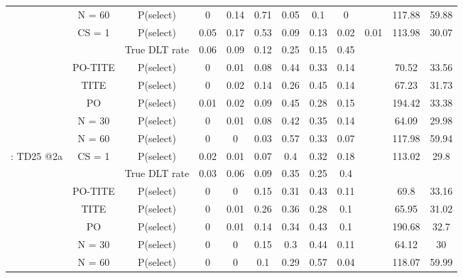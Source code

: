 \begin{table}
\begin{singlespace}
{\begin{tabular}[t]{cccccccccccc}
			\rowcolor{gray!6}   & N = 60 & P(select) & 0 & 0.14 & 0.71 & 0.05 & 0.1 & 0 &  & 117.88 & 59.88\\
			
			\rowcolor{gray!6}  \multirow{-7}{*}{\centering\arraybackslash 11: TD25 @1} & CS = 1 & P(select) & 0.05 & 0.17 & 0.53 & 0.09 & 0.13 & 0.02 & 0.01 & 113.98 & 30.07\\
			\cmidrule{1-12}
			&  & True DLT rate & 0.06 & 0.09 & 0.12 & 0.25 & 0.15 & 0.45 &  &  & \\
			
			& PO-TITE & P(select) & 0 & 0.01 & 0.08 & 0.44 & 0.33 & 0.14 &  & 70.52 & 33.56\\
			
			& TITE & P(select) & 0 & 0.02 & 0.14 & 0.26 & 0.45 & 0.14 &  & 67.23 & 31.73\\
			
			& PO & P(select) & 0.01 & 0.02 & 0.09 & 0.45 & 0.28 & 0.15 &  & 194.42 & 33.38\\
			
			& N = 30 & P(select) & 0 & 0.01 & 0.08 & 0.42 & 0.35 & 0.14 &  & 64.09 & 29.98\\
			
			& N = 60 & P(select) & 0 & 0 & 0.03 & 0.57 & 0.33 & 0.07 &  & 117.98 & 59.94\\
			
			\multirow{-7}{*}{\centering\arraybackslash 12: TD25 @2a} & CS = 1 & P(select) & 0.02 & 0.01 & 0.07 & 0.4 & 0.32 & 0.18 &  & 113.02 & 29.8\\
			\cmidrule{1-12}
			\rowcolor{gray!6}   &  & True DLT rate & 0.03 & 0.06 & 0.09 & 0.35 & 0.25 & 0.4 &  &  & \\
			
			\rowcolor{gray!6}   & PO-TITE & P(select) & 0 & 0 & 0.15 & 0.31 & 0.43 & 0.11 &  & 69.8 & 33.16\\
			
			\rowcolor{gray!6}   & TITE & P(select) & 0 & 0.01 & 0.26 & 0.36 & 0.28 & 0.1 &  & 65.95 & 31.02\\
			
			\rowcolor{gray!6}   & PO & P(select) & 0 & 0.01 & 0.14 & 0.34 & 0.43 & 0.1 &  & 190.68 & 32.7\\
			
			\rowcolor{gray!6}   & N = 30 & P(select) & 0 & 0 & 0.15 & 0.3 & 0.44 & 0.11 &  & 64.12 & 30\\
			
			\rowcolor{gray!6}   & N = 60 & P(select) & 0 & 0 & 0.1 & 0.29 & 0.57 & 0.04 &  & 118.07 & 59.99\\
			

\end{tabular}}
\end{singlespace}
\end{table}
